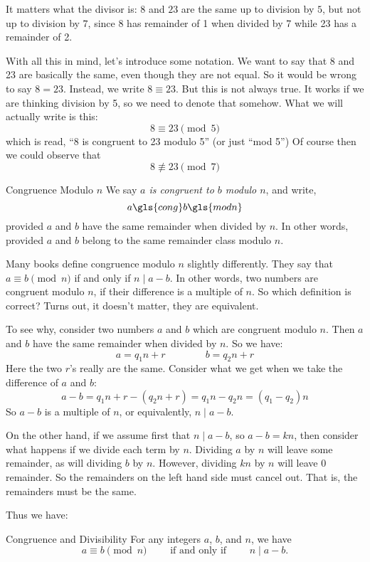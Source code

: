 \documentclass[12pt]{article}
\begin{document}
It matters what the divisor is: $8$ and $23$ are the same up to division by $5$, but not up to division by $7$, since $8$ has remainder of 1 when divided by 7 while 23 has a remainder of 2.  

With all this in mind, let's introduce some notation.  We want to say that $8$ and 23 are basically the same, even though they are not equal.  So it would be wrong to say $8 = 23$.  Instead, we write $8 \equiv 23$.  But this is not always true.  It works if we are thinking division by 5, so we need to denote that somehow.  What we will actually write is this:
\[8 \equiv 23 \pmod{5}\]
which is read, ``8 is congruent to 23 modulo 5'' (or just ``mod 5'')  Of course then we could observe that
\[8 \not\equiv 23 \pmod{7}\]

\begin{defbox}{Congruence Modulo $n$}
	We say {\em $a$ is  congruent to $b$ modulo $n$}, and write,
	\[a \gls{cong} b \gls{modn}	\]
	provided $a$ and $b$ have the same remainder when divided by $n$.  In other words, provided $a$ and $b$ belong to the same remainder class modulo $n$.
\end{defbox}

Many books define congruence modulo $n$ slightly differently.  They say that $a \equiv b \pmod{n}$ if and only if $n \mid a-b$.  In other words, two numbers are congruent modulo $n$, if their difference is a multiple of $n$.  So which definition is correct?  Turns out, it doesn't matter, they are equivalent.

To see why, consider two numbers $a$ and $b$ which are congruent modulo $n$.  Then $a$ and $b$ have the same remainder when divided by $n$. So we have:
\[a = q_1 n + r \qquad\qquad b = q_2 n + r\]
Here the two $r$'s really are the same.  Consider what we get when we take the difference of $a$ and $b$:
\[a-b = q_1n + r - (q_2n + r) = q_1n - q_2 n = (q_1-q_2)n\]
So $a-b$ is a multiple of $n$, or equivalently, $n \mid a-b$.

On the other hand, if we assume first that $n \mid a-b$, so $a-b = kn$, then consider what happens if we divide each term by $n$.  Dividing $a$ by $n$ will leave some remainder, as will dividing $b$ by $n$.  However, dividing $kn$ by $n$ will leave 0 remainder.  So the remainders on the left hand side must cancel out.  That is, the remainders must be the same.

Thus we have:

\begin{defbox}{Congruence and Divisibility}
	For any integers $a$, $b$, and $n$, we have
	\[a \equiv b \pmod{n} \qquad \mbox{ if and only if } \qquad n \mid a-b.\]
\end{defbox}
\end{document}
